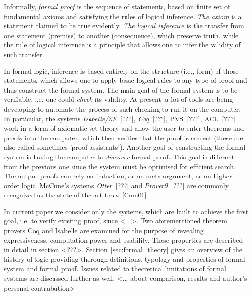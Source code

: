 \documentclass[article]{aaltoseries}
\begin{document}

Informally, \textit{formal proof} is the sequence of statements, based on finite set of fundamental axioms and satisfying the rules of logical inference. \textit{The axiom} is a statement claimed to be true evidently. \textit{The logical inference} is the transfer from one statement (premise) to another (consequence), which preserve truth, while the rule of logical inference is a principle that allows one to infer the validity of such transfer. 

In formal logic, inference is based entirely on the structure (i.e., form) of those statements, which allows one to apply basic logical rules to any type of proof and thus construct the formal system.
The main goal of the formal system is to be verifiable, i.e. one could \textit{check} its validity. At present, a lot of tools are being developing to automate the process of such checking to run it on the computer. In particular, the systems \textit{Isabelle/ZF}~[???], \textit{Coq}~[???], PVS~[???], ACL~[???] work in a form of axiomatic set theory and allow the user to enter theorems and proofs into the computer, which then verifies that the proof is correct (these are also called sometimes 'proof assistants').
Another goal of constructing the formal system is having the computer to \textit{discover} formal proof. This goal is different from the previous one since the system must be optimised for efficient search. The output proofs can rely on induction, or on meta argument, or on higher-order logic. McCune’s systems \textit{Otter}~[???] and \textit{Prover9}~[???] are commonly recognized as the state-of-the-art tools~[Com00].

In current paper we consider only the systems, which are built to achieve the first goal, i.e. to verify existing proof, since <...>. Two aforementioned theorem provers Coq and Isabelle are examined for the purpose of revealing expressiveness, computation power and usability. These properties are described in detail in section <???>. Section~\ref{sec:formal_theory} gives an overview of the history of logic providing thorough definitions, typology and properties of formal system and formal proof. Issues related to theoretical limitations of formal systems are discussed further as well. <... about comparison, results and author's personal contrubution>
\end{document}
